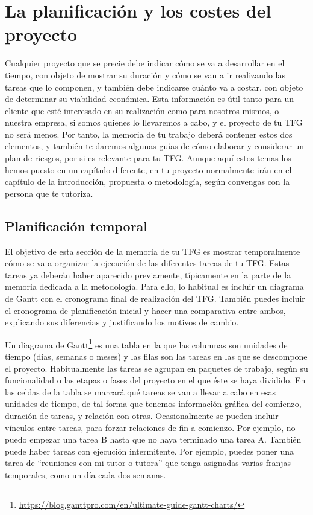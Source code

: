 \chapter{La planificación y los costes del proyecto}
\label{cap:PlanificacionPresupuesto}

Cualquier proyecto que se precie debe indicar cómo se va a desarrollar en el tiempo, con objeto de mostrar su duración y cómo se van a ir realizando las tareas que lo componen, y también debe indicarse cuánto va a costar, con objeto de determinar su viabilidad económica. Esta información es útil tanto para un cliente que esté interesado en su realización como para nosotros mismos, o nuestra empresa, si somos quienes lo llevaremos a cabo, y el proyecto de tu TFG no será menos. Por tanto, la memoria de tu trabajo deberá contener estos dos elementos, y también te daremos algunas guías de cómo elaborar y considerar un plan de riesgos, por si es relevante para tu TFG. Aunque aquí estos temas los hemos puesto en un capítulo diferente, en tu proyecto normalmente irán en el capítulo de la introducción, propuesta o metodología, según convengas con la persona que te tutoriza.

\section{Planificación temporal}
El objetivo de esta sección de la memoria de tu TFG es mostrar temporalmente cómo se va a organizar la ejecución de las diferentes tareas de tu TFG. Estas tareas ya deberán haber aparecido previamente, típicamente en la parte de la memoria dedicada a la metodología. Para ello, lo habitual es incluir un diagrama de Gantt con el cronograma final de realización del TFG. También puedes incluir el cronograma de planificación inicial y hacer una comparativa entre ambos, explicando sus diferencias y justificando los motivos de cambio.

Un {diagrama de Gantt}\footnote{\url{https://blog.ganttpro.com/en/ultimate-guide-gantt-charts/}} es una tabla en la que las columnas son unidades de tiempo (días, semanas o meses) y las filas son las tareas en las que se descompone el proyecto. Habitualmente las tareas se agrupan en paquetes de trabajo, según su funcionalidad o las etapas o fases del proyecto en el que éste se haya dividido. En las celdas de la tabla se marcará qué tareas se van a llevar a cabo en esas unidades de tiempo, de tal forma que tenemos información gráfica del comienzo, duración de tareas, y relación con otras. Ocasionalmente se pueden incluir vínculos entre tareas, para forzar relaciones de fin a comienzo. Por ejemplo, no puedo empezar una tarea B hasta que no haya terminado una tarea A. También puede haber tareas con ejecución intermitente. Por ejemplo, puedes poner una tarea de ``reuniones con mi tutor o tutora'' que tenga asignadas varias franjas temporales, como un día cada dos semanas.

